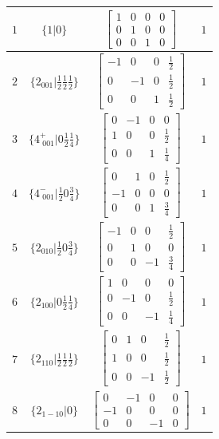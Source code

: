\documentclass[fleqn,8pt]{jsarticle}
\begin{document}
\begin{longtable}{cccc}
$ 1 $ & $ \{1|0\} $ & $ \begin{bmatrix} 1 & 0 & 0 & 0 \\ 0 & 1 & 0 & 0 \\ 0 & 0 & 1 & 0 \end{bmatrix} $ & $ 1 $ \\ \hline
$ 2 $ & $ \{2{}_{001}|\frac{1}{2} \frac{1}{2} \frac{1}{2}\} $ & $ \begin{bmatrix} -1 & 0 & 0 & \frac{1}{2} \\ 0 & -1 & 0 & \frac{1}{2} \\ 0 & 0 & 1 & \frac{1}{2} \end{bmatrix} $ & $ 1 $ \\ \hline
$ 3 $ & $ \{4^{+}_{\,\,001}|0 \frac{1}{2} \frac{1}{4}\} $ & $ \begin{bmatrix} 0 & -1 & 0 & 0 \\ 1 & 0 & 0 & \frac{1}{2} \\ 0 & 0 & 1 & \frac{1}{4} \end{bmatrix} $ & $ 1 $ \\ \hline
$ 4 $ & $ \{4^{-}_{\,\,001}|\frac{1}{2} 0 \frac{3}{4}\} $ & $ \begin{bmatrix} 0 & 1 & 0 & \frac{1}{2} \\ -1 & 0 & 0 & 0 \\ 0 & 0 & 1 & \frac{3}{4} \end{bmatrix} $ & $ 1 $ \\ \hline
$ 5 $ & $ \{2{}_{010}|\frac{1}{2} 0 \frac{3}{4}\} $ & $ \begin{bmatrix} -1 & 0 & 0 & \frac{1}{2} \\ 0 & 1 & 0 & 0 \\ 0 & 0 & -1 & \frac{3}{4} \end{bmatrix} $ & $ 1 $ \\ \hline
$ 6 $ & $ \{2{}_{100}|0 \frac{1}{2} \frac{1}{4}\} $ & $ \begin{bmatrix} 1 & 0 & 0 & 0 \\ 0 & -1 & 0 & \frac{1}{2} \\ 0 & 0 & -1 & \frac{1}{4} \end{bmatrix} $ & $ 1 $ \\ \hline
$ 7 $ & $ \{2{}_{110}|\frac{1}{2} \frac{1}{2} \frac{1}{2}\} $ & $ \begin{bmatrix} 0 & 1 & 0 & \frac{1}{2} \\ 1 & 0 & 0 & \frac{1}{2} \\ 0 & 0 & -1 & \frac{1}{2} \end{bmatrix} $ & $ 1 $ \\ \hline
$ 8 $ & $ \{2{}_{1-10}|0\} $ & $ \begin{bmatrix} 0 & -1 & 0 & 0 \\ -1 & 0 & 0 & 0 \\ 0 & 0 & -1 & 0 \end{bmatrix} $ & $ 1 $ \\
\end{longtable}
\end{document}
